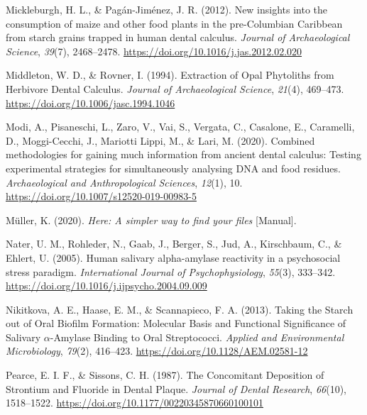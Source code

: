 \documentclass[
  b5paper,
]{book}
\newlength{\cslhangindent}
\newlength{\cslentryspacingunit} %
\newenvironment{CSLReferences}[2] %
 {%
  \setlength{\parindent}{0pt}
  \ifodd #1
  \let\oldpar\par
  \def\par{\hangindent=\cslhangindent\oldpar}
  \fi
  \setlength{\parskip}{#2\cslentryspacingunit}
 }%
 {}
\begin{document}
\begin{CSLReferences}{1}{0}
\leavevmode{}%
Mickleburgh, H. L., \& Pagán-Jiménez, J. R. (2012). New insights into
the consumption of maize and other food plants in the pre-{Columbian
Caribbean} from starch grains trapped in human dental calculus.
\emph{Journal of Archaeological Science}, \emph{39}(7), 2468--2478.
\url{https://doi.org/10.1016/j.jas.2012.02.020}

\leavevmode{}%
Middleton, W. D., \& Rovner, I. (1994). Extraction of {Opal Phytoliths}
from {Herbivore Dental Calculus}. \emph{Journal of Archaeological
Science}, \emph{21}(4), 469--473.
\url{https://doi.org/10.1006/jasc.1994.1046}

\leavevmode{}%
Modi, A., Pisaneschi, L., Zaro, V., Vai, S., Vergata, C., Casalone, E.,
Caramelli, D., Moggi-Cecchi, J., Mariotti Lippi, M., \& Lari, M. (2020).
Combined methodologies for gaining much information from ancient dental
calculus: Testing experimental strategies for simultaneously analysing
{DNA} and food residues. \emph{Archaeological and Anthropological
Sciences}, \emph{12}(1), 10.
\url{https://doi.org/10.1007/s12520-019-00983-5}

\leavevmode{}%
Müller, K. (2020). \emph{Here: {A} simpler way to find your files}
{[}Manual{]}.

\leavevmode{}%
Nater, U. M., Rohleder, N., Gaab, J., Berger, S., Jud, A., Kirschbaum,
C., \& Ehlert, U. (2005). Human salivary alpha-amylase reactivity in a
psychosocial stress paradigm. \emph{International Journal of
Psychophysiology}, \emph{55}(3), 333--342.
\url{https://doi.org/10.1016/j.ijpsycho.2004.09.009}

\leavevmode{}%
Nikitkova, A. E., Haase, E. M., \& Scannapieco, F. A. (2013). Taking the
{Starch} out of {Oral Biofilm Formation}: {Molecular Basis} and
{Functional Significance} of {Salivary} {\(\alpha\)}-{Amylase Binding}
to {Oral Streptococci}. \emph{Applied and Environmental Microbiology},
\emph{79}(2), 416--423. \url{https://doi.org/10.1128/AEM.02581-12}

\leavevmode{}%
Pearce, E. I. F., \& Sissons, C. H. (1987). The {Concomitant Deposition}
of {Strontium} and {Fluoride} in {Dental Plaque}. \emph{Journal of
Dental Research}, \emph{66}(10), 1518--1522.
\url{https://doi.org/10.1177/00220345870660100101}


\end{CSLReferences}
\end{document}
